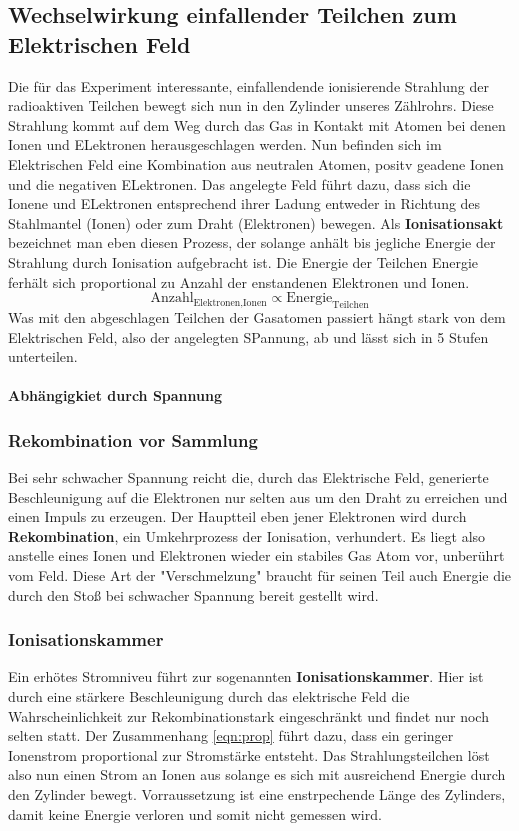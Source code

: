 \subsection{Wechselwirkung einfallender Teilchen zum Elektrischen Feld} %
Die für das Experiment interessante, einfallendende ionisierende Strahlung der radioaktiven Teilchen bewegt sich nun in den Zylinder unseres Zählrohrs.
Diese Strahlung kommt auf dem Weg durch das Gas in Kontakt mit Atomen bei denen Ionen und ELektronen herausgeschlagen werden. 
Nun befinden sich im Elektrischen Feld eine Kombination aus neutralen Atomen, positv geadene Ionen und die negativen ELektronen. 
Das angelegte Feld führt dazu, dass sich die Ionene und ELektronen entsprechend ihrer Ladung entweder in Richtung des Stahlmantel (Ionen) oder zum Draht (Elektronen) bewegen.
Als \textbf{Ionisationsakt} bezeichnet man eben diesen Prozess, der solange anhält bis jegliche Energie der Strahlung durch Ionisation aufgebracht ist.
Die Energie der Teilchen Energie ferhält sich proportional zu Anzahl der enstandenen Elektronen und Ionen. 
\begin{equation}
\label{eqn:prop}
\text{Anzahl}_\text{Elektronen,Ionen} \propto \text{Energie}_\text{Teilchen}
\end{equation}
Was mit den abgeschlagen Teilchen der Gasatomen passiert hängt stark von dem Elektrischen Feld, also der angelegten SPannung, ab und lässt sich in 5 Stufen unterteilen.

\paragraph{Abhängigkiet durch Spannung} \mbox{}

\subsubsection{Rekombination vor Sammlung}
Bei sehr schwacher Spannung reicht die, durch das Elektrische Feld, generierte Beschleunigung auf die Elektronen nur selten aus um den Draht zu erreichen und einen Impuls zu erzeugen.
Der Hauptteil eben jener Elektronen wird durch \textbf{Rekombination}, ein Umkehrprozess der Ionisation, verhundert. Es liegt also anstelle eines Ionen und Elektronen wieder ein stabiles Gas Atom vor, unberührt vom Feld.
Diese Art der "Verschmelzung" braucht für seinen Teil auch Energie die durch den Stoß bei schwacher Spannung bereit gestellt wird.
\subsubsection{Ionisationskammer}
Ein erhötes Stromniveu führt zur sogenannten \textbf{Ionisationskammer}. Hier ist durch eine stärkere Beschleunigung durch das elektrische Feld die Wahrscheinlichkeit zur Rekombinationstark eingeschränkt und findet nur noch selten statt. 
Der Zusammenhang \eqref{eqn:prop} führt dazu, dass ein geringer Ionenstrom proportional zur Stromstärke entsteht.
Das Strahlungsteilchen löst also nun einen Strom an Ionen aus solange es sich mit ausreichend Energie durch den Zylinder bewegt. Vorraussetzung ist eine enstrpechende Länge des Zylinders, damit keine Energie verloren und somit nicht gemessen wird.
